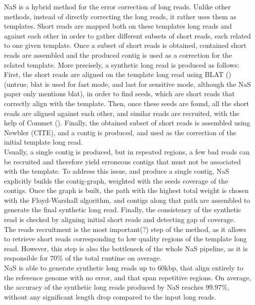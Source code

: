 \documentclass{bioinfo}
\begin{document}
NaS is a hybrid method for the error correction of long reads. Unlike other methods, instead of directly correcting the long reads, it rather uses them as
templates. Short reads are mapped both on these templates long reads and against each other in order to gather different subsets of short reads, each 
related to one given template. Once a subset of short reads is obtained, contained short reads are assembled and the produced contig is used as a correction for the related template. More precisely, a synthetic long read is produced as follows: \\
\indent First, the short reads are aligned on the template long read using BLAT (\cite{Kent2002}) (untrue, blat is used for fast mode, and last for sensitive mode, although the NaS paper only mentions blat), in order to find seeds, which are short reads that correctly align with the template. Then, once these seeds are found, all the short reads are aligned against each other, and similar reads are recruited,
with the help of Commet (\cite{Maillet2014}). Finally, the obtained subset of short reads is assembled using Newbler (CITE), and a contig is produced,
and used as the correction of the initial template long read. \\ 
\indent Usually, a single contig is produced, but in repeated regions, a few bad reads can be recruited and therefore yield erroneous contigs 
that must not be associated with the template. To address this issue, and produce a single contig, NaS explicitly builds the contig-graph, 
weighted with the seeds coverage of the contigs. Once the graph is built, the path with the highest total weight is chosen with the Floyd-Warshall
algorithm, and contigs along that path are assembled to generate the final synthetic long read. Finally, the consistency of the synthetic read is checked
by aligning initial short reads and detecting gap of coverage. \\
\indent The reads recruitment is the most important(?) step of the method, as it allows to retrieve short reads corresponding to low quality
regions of the template long read. However, this step is also the bottleneck of the whole NaS pipeline, as it is responsible for 70\% of the
total runtime on average. \\
\indent NaS is able to generate synthetic long reads up to 60kbp, that align entirely to the reference genome with no error, and that span
repetitive regions. On average, the accuracy of the synthetic long reads produced by NaS reaches 99.97\%, without any significant length drop
compared to the input long reads.
\end{document}
